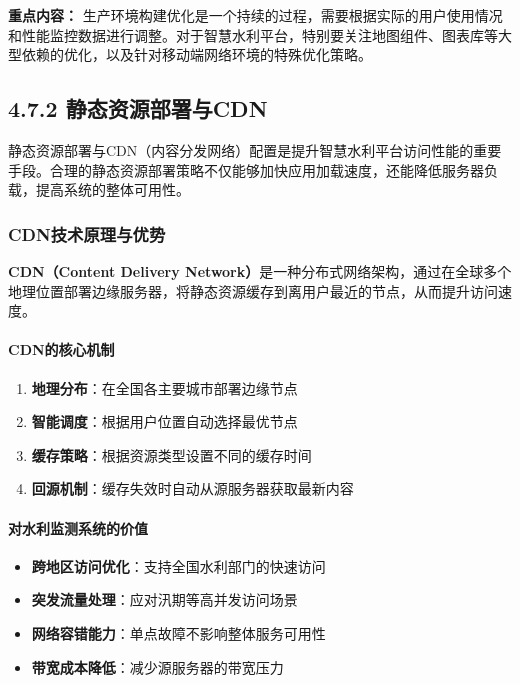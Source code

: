 \textbf{重点内容：} 生产环境构建优化是一个持续的过程，需要根据实际的用户使用情况和性能监控数据进行调整。对于智慧水利平台，特别要关注地图组件、图表库等大型依赖的优化，以及针对移动端网络环境的特殊优化策略。

\subsection{4.7.2 静态资源部署与CDN}\label{ux9759ux6001ux8d44ux6e90ux90e8ux7f72ux4e0ecdn}

静态资源部署与CDN（内容分发网络）配置是提升智慧水利平台访问性能的重要手段。合理的静态资源部署策略不仅能够加快应用加载速度，还能降低服务器负载，提高系统的整体可用性。

\subsubsection{CDN技术原理与优势}\label{cdnux6280ux672fux539fux7406ux4e0eux4f18ux52bf}

\textbf{CDN（Content Delivery Network）}是一种分布式网络架构，通过在全球多个地理位置部署边缘服务器，将静态资源缓存到离用户最近的节点，从而提升访问速度。

\paragraph{CDN的核心机制}\label{cdnux7684ux6838ux5fc3ux673aux5236}

\begin{enumerate}
\def\labelenumi{\arabic{enumi}.}
\tightlist
\item
  \textbf{地理分布}：在全国各主要城市部署边缘节点
\item
  \textbf{智能调度}：根据用户位置自动选择最优节点
\item
  \textbf{缓存策略}：根据资源类型设置不同的缓存时间
\item
  \textbf{回源机制}：缓存失效时自动从源服务器获取最新内容
\end{enumerate}

\paragraph{对水利监测系统的价值}\label{ux5bf9ux6c34ux5229ux76d1ux6d4bux7cfbux7edfux7684ux4ef7ux503c}

\begin{itemize}
\tightlist
\item
  \textbf{跨地区访问优化}：支持全国水利部门的快速访问
\item
  \textbf{突发流量处理}：应对汛期等高并发访问场景
\item
  \textbf{网络容错能力}：单点故障不影响整体服务可用性
\item
  \textbf{带宽成本降低}：减少源服务器的带宽压力
\end{itemize}

